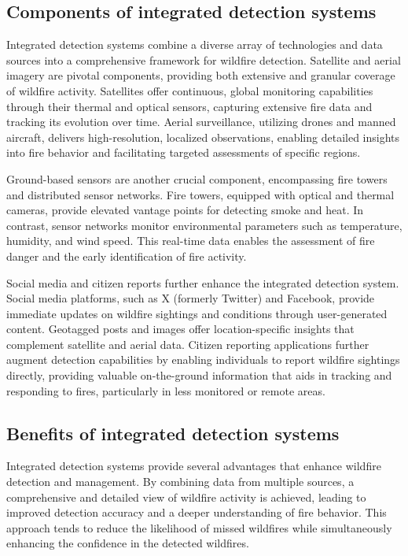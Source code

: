 \documentclass[
  12 pt,
]{Nemilov}
\begin{document}
\subsection{Components of integrated detection systems}\label{components-of-integrated-detection-systems}

Integrated detection systems combine a diverse array of technologies and data sources into a comprehensive framework for wildfire detection. Satellite and aerial imagery are pivotal components, providing both extensive and granular coverage of wildfire activity. Satellites offer continuous, global monitoring capabilities through their thermal and optical sensors, capturing extensive fire data and tracking its evolution over time. Aerial surveillance, utilizing drones and manned aircraft, delivers high-resolution, localized observations, enabling detailed insights into fire behavior and facilitating targeted assessments of specific regions.

Ground-based sensors are another crucial component, encompassing fire towers and distributed sensor networks. Fire towers, equipped with optical and thermal cameras, provide elevated vantage points for detecting smoke and heat. In contrast, sensor networks monitor environmental parameters such as temperature, humidity, and wind speed. This real-time data enables the assessment of fire danger and the early identification of fire activity.

Social media and citizen reports further enhance the integrated detection system. Social media platforms, such as X (formerly Twitter) and Facebook, provide immediate updates on wildfire sightings and conditions through user-generated content. Geotagged posts and images offer location-specific insights that complement satellite and aerial data. Citizen reporting applications further augment detection capabilities by enabling individuals to report wildfire sightings directly, providing valuable on-the-ground information that aids in tracking and responding to fires, particularly in less monitored or remote areas.

\subsection{Benefits of integrated detection systems}\label{benefits-of-integrated-detection-systems}

Integrated detection systems provide several advantages that enhance wildfire detection and management. By combining data from multiple sources, a comprehensive and detailed view of wildfire activity is achieved, leading to improved detection accuracy and a deeper understanding of fire behavior. This approach tends to reduce the likelihood of missed wildfires while simultaneously enhancing the confidence in the detected wildfires.
\end{document}
